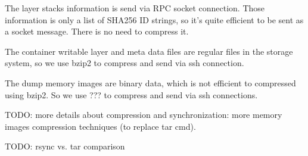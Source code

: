 
The layer stacks information is send via RPC socket connection. Those information is only a list of SHA256 ID strings, so it's quite efficient to be sent as a socket message. There is no need to compress it.

The container writable layer and meta data files are regular files in the storage system, so we use bzip2  to compress and send via ssh connection.

The dump memory images are binary data, which is not efficient to compressed using bzip2. So we use ??? to compress and send via ssh connections.






TODO: more details about compression and synchronization: more memory images compression techniques (to replace tar cmd). 

TODO: rsync vs. tar comparison

